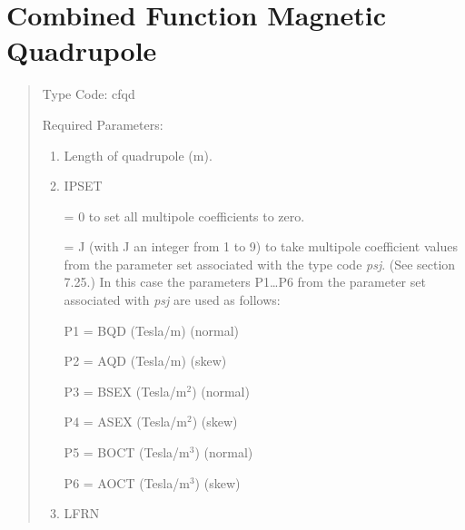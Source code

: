 \section{Combined Function Magnetic Quadrupole}
\begin{quotation}
\noindent Type Code:  cfqd  
\vspace{5mm}

\noindent Required Parameters:
\begin{enumerate}
      \item  Length of quadrupole (m).

      \item  IPSET

             = 0 to set all multipole coefficients to zero.

             = J (with J an integer from 1 to 9) to take multipole
               coefficient values from \hspace*{1em}the parameter set associated with
               the type code {\em psj}.  (See section 7.25.)  \hspace*{1em}In this case
               the parameters P1\ldots P6 from the parameter set associated
               \hspace*{1em}with {\em psj } are used as follows:

           \hspace*{2em}  P1 = BQD (Tesla/m) \hspace{1em} (normal)

           \hspace*{2em}  P2 = AQD (Tesla/m) \hspace{1em} (skew)

           \hspace*{2em}  P3 = BSEX (Tesla/$\mbox{m}^2$) \hspace{1em} (normal)

           \hspace*{2em}  P4 = ASEX (Tesla/$\mbox{m}^2$) \hspace{1em} (skew)

           \hspace*{2em}  P5 = BOCT (Tesla/$\mbox{m}^3$) \hspace{1em} (normal)

           \hspace*{2em}  P6 = AOCT (Tesla/$\mbox{m}^3$) \hspace{1em} (skew)

      \item  LFRN


\end{enumerate}
\end{quotation}
